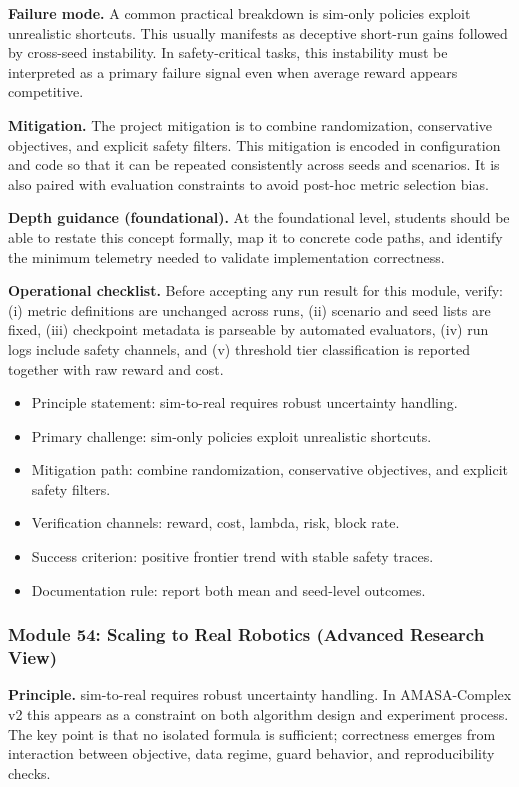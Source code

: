 \documentclass[conference]{IEEEtran}
\begin{document}
\textbf{Failure mode.} A common practical breakdown is sim-only policies exploit unrealistic shortcuts. This usually manifests as deceptive short-run gains followed by cross-seed instability. In safety-critical tasks, this instability must be interpreted as a primary failure signal even when average reward appears competitive.

\textbf{Mitigation.} The project mitigation is to combine randomization, conservative objectives, and explicit safety filters. This mitigation is encoded in configuration and code so that it can be repeated consistently across seeds and scenarios. It is also paired with evaluation constraints to avoid post-hoc metric selection bias.

\textbf{Depth guidance (foundational).} At the foundational level, students should be able to restate this concept formally, map it to concrete code paths, and identify the minimum telemetry needed to validate implementation correctness.

\textbf{Operational checklist.} Before accepting any run result for this module, verify: (i) metric definitions are unchanged across runs, (ii) scenario and seed lists are fixed, (iii) checkpoint metadata is parseable by automated evaluators, (iv) run logs include safety channels, and (v) threshold tier classification is reported together with raw reward and cost.

\begin{itemize}[leftmargin=*]
  \item Principle statement: sim-to-real requires robust uncertainty handling.
  \item Primary challenge: sim-only policies exploit unrealistic shortcuts.
  \item Mitigation path: combine randomization, conservative objectives, and explicit safety filters.
  \item Verification channels: reward, cost, lambda, risk, block rate.
  \item Success criterion: positive frontier trend with stable safety traces.
  \item Documentation rule: report both mean and seed-level outcomes.
\end{itemize}


\subsubsection{Module 54: Scaling to Real Robotics (Advanced Research View)}
\textbf{Principle.} sim-to-real requires robust uncertainty handling. In AMASA-Complex v2 this appears as a constraint on both algorithm design and experiment process. The key point is that no isolated formula is sufficient; correctness emerges from interaction between objective, data regime, guard behavior, and reproducibility checks.
\end{document}
